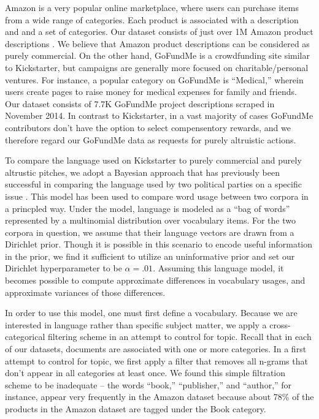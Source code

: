 \documentclass[letterpaper]{article}
\begin{document}
Amazon is a very popular online marketplace, where users can purchase items from a wide range of categories. Each product is associated with a description and and a set of categories. Our dataset consists of just over 1M Amazon product descriptions \cite{mcauley2013hidden}. We believe that Amazon product descriptions can be considered as purely commercial. On the other hand, GoFundMe is a crowdfunding site similar to Kickstarter, but campaigns are generally more focused on charitable/personal ventures. For instance, a popular category on GoFundMe is ``Medical,'' wherein users create pages to raise money for medical expenses for family and friends. Our dataset consists of 7.7K GoFundMe project descriptions scraped in November 2014. In contrast to Kickstarter, in a vast majority of cases GoFundMe contributors don't have the option to select compensentory rewards, and we therefore regard our GoFundMe data as requests for purely altruistic actions.

To compare the language used on Kickstarter to purely commercial and purely altrustic pitches, we adopt a Bayesian approach that has previously been successful in comparing the language used by two political parties on a specific issue \cite{monroe2008fightin}. This model has been used to compare word usage between two corpora in a princpled way. Under the model, language is modeled as a ``bag of words'' represented by a multinomial distribution over vocabulary items. For the two corpora in question, we assume that their language vectors are drawn from a Dirichlet prior. Though it is possible in this scenario to encode useful information in the prior, we find it sufficient to utilize an uninformative prior and set our Dirichlet hyperparameter to be $\alpha=.01$. Assuming this language model, it becomes possible to compute approximate differences in vocabulary usages, and approximate variances of those differences.

In order to use this model, one must first define a vocabulary. Because we are interested in language rather than specific subject matter, we apply a cross-categorical filtering scheme in an attempt to control for topic. Recall that in each of our datasets, documents are associated with one or more categories. In a first attempt to control for topic, we first apply a filter that removes all n-grams that don't appear in all categories at least once. We found this simple filtration scheme to be inadequate -- the words ``book,'' ``publisher,'' and ``author,'' for instance, appear very frequently in the Amazon dataset because about 78\% of the products in the Amazon dataset are tagged under the Book category.
\end{document}
